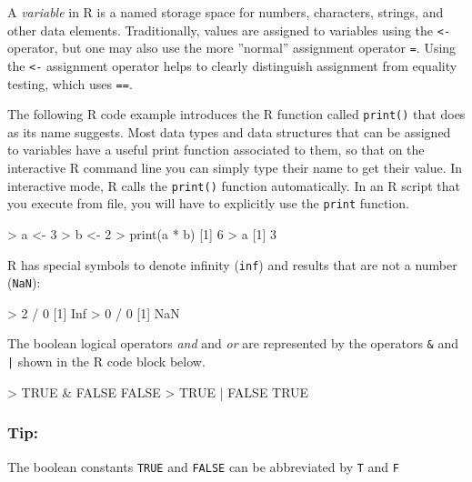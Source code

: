 A \emph{variable} in R is a named storage space for numbers, characters, strings, and other data elements. Traditionally, values are assigned to variables using the \texttt{<-} operator, but one may also use the more ''normal'' assignment operator \texttt{=}. Using the \texttt{<-} assignment operator helps to clearly distinguish assignment from equality testing, which uses \texttt{==}. 

The following R code example introduces the R function called \texttt{print()} that does as its name suggests. Most data types and data structures that can be assigned to variables have a useful print function associated to them, so that on the interactive R command line you can simply type their name to get their value. In interactive mode, R calls the \texttt{print()} function automatically. In an R script that you execute from file, you will have to explicitly use the \texttt{print} function.

\begin{samepage}
\begin{Rcode}
> a <- 3
> b <- 2
> print(a * b)
[1] 6
> a
[1] 3
\end{Rcode}
\end{samepage}

R has special symbols to denote infinity (\texttt{inf}) and results that are not a number (\texttt{NaN}):

\begin{samepage}
\begin{Rcode}
> 2 / 0
[1] Inf
> 0 / 0
[1] NaN
\end{Rcode}
\end{samepage}

\noindent The boolean logical operators \emph{and} and \emph{or} are represented by the operators \texttt{\&} and \texttt{|} shown in the R code block below.

\begin{samepage}
\begin{Rcode}
> TRUE & FALSE
FALSE
> TRUE | FALSE
TRUE
\end{Rcode}
\end{samepage}

\begin{tcolorbox}[colback=code]
\subsubsection*{Tip:}
The boolean constants \texttt{TRUE} and \texttt{FALSE} can be abbreviated by \texttt{T} and \texttt{F}
\end{tcolorbox}


